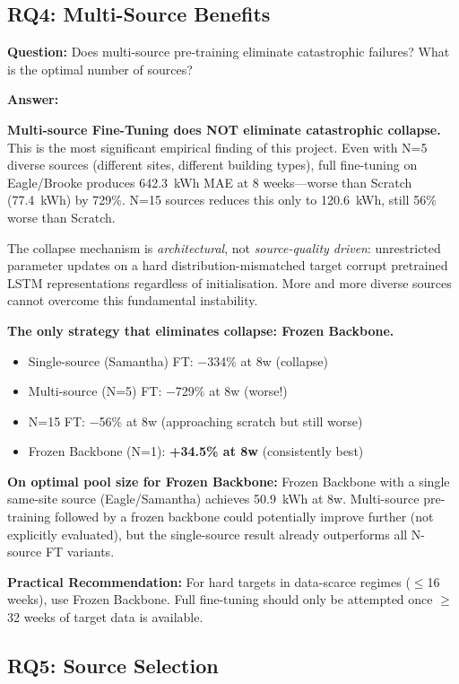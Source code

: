 \documentclass[12pt,a4paper]{report}
\begin{document}
\subsection{RQ4: Multi-Source Benefits}

\textbf{Question:} Does multi-source pre-training eliminate catastrophic failures? What is the optimal number of sources?

\textbf{Answer:}

\textbf{Multi-source Fine-Tuning does NOT eliminate catastrophic collapse.} This is the most significant empirical finding of this project. Even with N=5 diverse sources (different sites, different building types), full fine-tuning on Eagle/Brooke produces 642.3~kWh MAE at 8 weeks---worse than Scratch (77.4~kWh) by 729\%. N=15 sources reduces this only to 120.6~kWh, still 56\% worse than Scratch.

The collapse mechanism is \textit{architectural}, not \textit{source-quality driven}: unrestricted parameter updates on a hard distribution-mismatched target corrupt pretrained LSTM representations regardless of initialisation. More and more diverse sources cannot overcome this fundamental instability.

\textbf{The only strategy that eliminates collapse: Frozen Backbone.}

\begin{itemize}
    \item Single-source (Samantha) FT: $-$334\% at 8w (collapse)
    \item Multi-source (N=5) FT: $-$729\% at 8w (worse!)
    \item N=15 FT: $-$56\% at 8w (approaching scratch but still worse)
    \item Frozen Backbone (N=1): \textbf{+34.5\% at 8w} (consistently best)
\end{itemize}

\textbf{On optimal pool size for Frozen Backbone:} Frozen Backbone with a single same-site source (Eagle/Samantha) achieves 50.9~kWh at 8w. Multi-source pre-training followed by a frozen backbone could potentially improve further (not explicitly evaluated), but the single-source result already outperforms all N-source FT variants.

\textbf{Practical Recommendation:} For hard targets in data-scarce regimes ($\leq$16 weeks), use Frozen Backbone. Full fine-tuning should only be attempted once $\geq$32 weeks of target data is available.

\subsection{RQ5: Source Selection}
\end{document}
